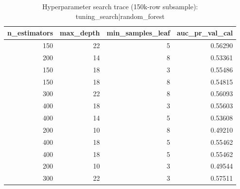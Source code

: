 \begin{table}
\caption{Hyperparameter search trace (150k-row subsample): tuning_search|random_forest}
\label{tab:table14_hp_search_random_forest}
\begin{tabular}{rrrr}
\toprule
n\_estimators & max\_depth & min\_samples\_leaf & auc\_pr\_val\_cal \\
\midrule
150 & 22 & 5 & 0.56290 \\
200 & 14 & 8 & 0.53361 \\
150 & 18 & 3 & 0.55486 \\
150 & 18 & 8 & 0.54815 \\
300 & 22 & 8 & 0.56093 \\
400 & 18 & 3 & 0.55603 \\
400 & 14 & 5 & 0.53608 \\
200 & 10 & 8 & 0.49210 \\
400 & 18 & 5 & 0.55462 \\
400 & 18 & 5 & 0.55462 \\
200 & 10 & 3 & 0.49544 \\
300 & 22 & 3 & 0.57511 \\
\bottomrule
\end{tabular}
\end{table}
